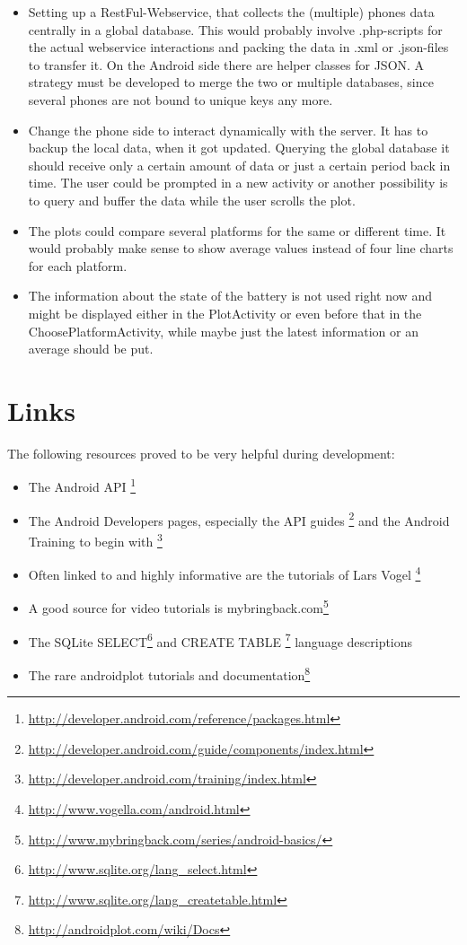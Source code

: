 \documentclass[11pt,oneside,a4paper]{scrartcl}
\begin{document}
\begin{itemize}
\item
Setting up a RestFul-Webservice, that collects the (multiple) phones data centrally in a global database. This would probably involve .php-scripts for the actual webservice interactions and packing the data in .xml or .json-files to transfer it. On the Android side there are helper classes for JSON.
A strategy must be developed to merge the two or multiple databases, since several phones are not bound to unique keys any more. 

\item
Change the phone side to interact dynamically with the server. It has to backup the local data, when it got updated. Querying the global database it should receive only a certain amount of data or just a certain period back in time. The user could be prompted in a new activity or another possibility is to query and buffer the data while the user scrolls the plot.

\item
The plots could compare several platforms for the same or different time. It would probably make sense to show average values instead of four line charts for each platform.

\item
The information about the state of the battery is not used right now and might be displayed either in the PlotActivity or even before that in the ChoosePlatformActivity, while maybe just the latest information or an average should be put.

\end{itemize}

\section{Links}
The following resources proved to be very helpful during development:

\begin{itemize}\itemsep0pt
\item The Android API \footnote{\url{http://developer.android.com/reference/packages.html}}
\item The Android Developers pages, especially the API guides \footnote{\url{http://developer.android.com/guide/components/index.html}} and the Android Training to begin with \footnote{\url{http://developer.android.com/training/index.html}}
\item Often linked to and highly informative are the tutorials of Lars Vogel \footnote{\url{http://www.vogella.com/android.html}}
\item A good source for video tutorials is mybringback.com\footnote{\url{http://www.mybringback.com/series/android-basics/}}
\item The SQLite SELECT\footnote{\url{http://www.sqlite.org/lang_select.html}} and CREATE TABLE \footnote{\url{http://www.sqlite.org/lang_createtable.html}} language descriptions
\item The rare androidplot tutorials and documentation\footnote{\url{http://androidplot.com/wiki/Docs}}

\end{itemize}


\end{document}

